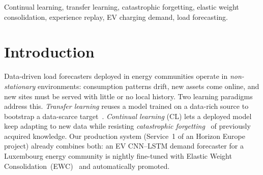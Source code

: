 \documentclass[conference]{IEEEtran}
\begin{document}
\begin{abstract}
($\mathrm{cosine}{=}0.82$), so regularising toward the source weights fights
exactly the updates the target needs, whereas replay works by direct source
coverage. Finally, and most importantly, we show the true bottleneck is the
\textbf{output representation, not the algorithm}: two domain-native reformulations --- per-unit
normalisation (power engineering) and the clear-sky index (solar engineering) ---
cut transfer error by ${\sim}33\%$ (EV) and ${\sim}32\times$ (PV) and collapse the
source/target Fisher-scale mismatch from $211\times$ to ${\sim}2\times$. A
\textbf{controlled representation ablation} further shows that, among
representations, the best choice depends on how much domain structure it encodes:
a generic learned per-instance normalisation (RevIN) beats the thin per-unit
representation on EV ($p{=}0.008$), whereas the richer clear-sky index beats RevIN
on PV ($p{=}0.008$). Across
nine real European countries, the transfer gap grows with domain distance
($\rho{=}0.88$, $p{=}0.004$) --- but this is largely mediated by the target's
intrinsic predictability rather than a pure distance penalty. We characterise each domain shift (dominated by a
$6\times$ demand-scale gap for EV, $50\times$ for PV) and release a fully
reproducible, GPU-accelerated pipeline.
\end{abstract}

\begin{IEEEkeywords}
Continual learning, transfer learning, catastrophic forgetting, elastic weight
consolidation, experience replay, EV charging demand, load forecasting.
\end{IEEEkeywords}

\section{Introduction}
Data-driven load forecasters deployed in energy communities operate in
\emph{non-stationary} environments: consumption patterns drift, new assets come
online, and new sites must be served with little or no local history. Two
learning paradigms address this. \emph{Transfer learning} reuses a model trained
on a data-rich source to bootstrap a data-scarce target~\cite{PanYang2010}.
\emph{Continual learning} (CL) lets a deployed model keep adapting to new data
while resisting \emph{catastrophic forgetting}~\cite{McCloskey1989,French1999}
of previously acquired knowledge. Our production system (Service~1 of an Horizon
Europe project) already combines both: an EV CNN--LSTM demand forecaster for a
Luxembourg energy community is nightly fine-tuned with Elastic Weight
Consolidation~(EWC)~\cite{Kirkpatrick2017} and automatically promoted.
\end{document}
